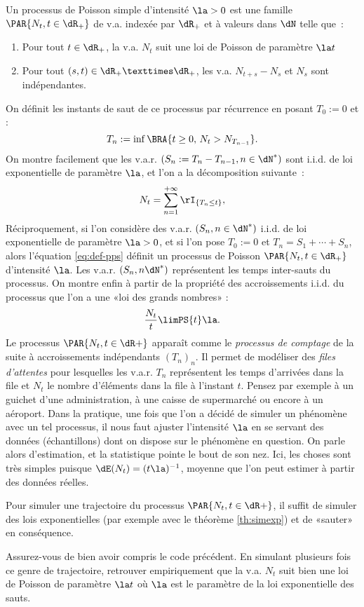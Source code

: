 Un processus de Poisson simple d'intensité $\la>0$ est une famille
$\PAR{N_t,t\in\dR_+}$ de v.a. indexée par $\dR_+$ et à valeurs dans $\dN$
telle que~:
\begin{enumerate}
\item Pour tout $t\in\dR_+$, la v.a. $N_t$ suit une loi de Poisson de paramètre
  $\la t$
\item Pour tout $(s,t)\in\dR_+×\dR_+$, les v.a. $N_{t+s}-N_s$ et $N_s$ sont
  indépendantes.
\end{enumerate}
On définit les instants de saut de ce processus par récurrence en posant
$T_0:=0$ et :
$$
T_n:=\inf\BRA{t\geq 0,\,N_t>N_{T_{n-1}}}.
$$
On montre facilement que les v.a.r. $(S_n:=T_n-T_{n-1},n\in\dN^*)$ sont i.i.d.
de loi exponentielle de paramètre $\la$, et l'on a la décomposition suivante~:
\begin{equation}\label{eq:def-pps}
N_t=\sum_{n=1}^{+\infty} \rI_{\{T_n \leq t\}},
\end{equation}
Réciproquement, si l'on considère des v.a.r. $(S_n,n\in\dN^*)$ i.i.d. de loi
exponentielle de paramètre $\la>0$, et si l'on pose $T_0:=0$ et
$T_n=S_1+\cdots+S_n$, alors l'équation \eqref{eq:def-pps} définit un processus de
Poisson $\PAR{N_t,t\in\dR_+}$ d'intensité $\la$.  Les v.a.r. $(S_n,n\dN^*)$
représentent les temps inter-sauts du processus. On montre enfin à partir de
la propriété des accroissements i.i.d. du processus que l'on a une «loi des
grands nombres» :
\begin{equation}
\frac{N_t}{t} \limPS{t} \la.\label{eq:LGN-ppoiss}
\end{equation}
Le processus $\PAR{N_t,t\in\dR+}$ apparaît comme le \emph{processus de comptage}
de la suite à accroissements indépendants $(T_n)_n$. Il permet de modéliser
des \emph{files d'attentes} pour lesquelles les v.a.r. $T_n$ représentent les
temps d'arrivées dans la file et $N_t$ le nombre d'éléments dans la file à
l'instant $t$. Pensez par exemple à un guichet d'une administration, à une
caisse de supermarché ou encore à un aéroport. Dans la pratique, une fois que
l'on a décidé de simuler un phénomène avec un tel processus, il nous faut
ajuster l'intensité $\la$ en se servant des données (échantillons) dont on
dispose sur le phénomène en question. On parle alors d'estimation, et la
statistique pointe le bout de son nez. Ici, les choses sont très simples
puisque $\dE(N_t)=(t\la)^{-1}$, moyenne que l'on peut estimer à partir des
données réelles.

Pour simuler une trajectoire du processus $\PAR{N_t,t\in\dR+}$, il suffit de
simuler des lois exponentielles (par exemple avec le théorème \ref{th:simexp})
et de «sauter» en conséquence. 
\begin{exo}
  Assurez-vous de bien avoir compris le code précédent.  En simulant plusieurs
  fois ce genre de trajectoire, retrouver empiriquement que la v.a. $N_t$ suit
  bien une loi de Poisson de paramètre $\la t$ où $\la$ est le paramètre de la
  loi exponentielle des sauts.
\end{exo}

